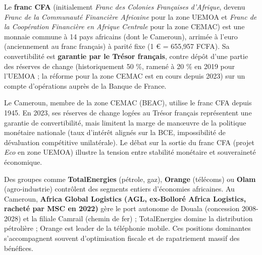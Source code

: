 \documentclass[11pt]{article}
\begin{document}
\begin{definition}
Le \textbf{franc CFA} (initialement \emph{Franc des Colonies Françaises d'Afrique}, devenu \emph{Franc de la Communauté Financière Africaine} pour la zone UEMOA et \emph{Franc de la Coopération Financière en Afrique Centrale} pour la zone CEMAC) est une monnaie commune à 14 pays africains (dont le Cameroun), arrimée à l'euro (anciennement au franc français) à parité fixe (1 € = 655,957 FCFA). Sa convertibilité est \textbf{garantie par le Trésor français}, contre dépôt d'une partie des réserves de change (historiquement 50 \%, ramené à 20 \% en 2019 pour l'UEMOA ; la réforme pour la zone CEMAC est en cours depuis 2023) sur un compte d'opérations auprès de la Banque de France.
\end{definition}

\begin{exemplebox}
Le Cameroun, membre de la zone CEMAC (BEAC), utilise le franc CFA depuis 1945. En 2023, ses réserves de change logées au Trésor français représentent une garantie de convertibilité, mais limitent la marge de manœuvre de la politique monétaire nationale (taux d'intérêt alignés sur la BCE, impossibilité de dévaluation compétitive unilatérale). Le débat sur la sortie du franc CFA (projet \emph{Eco} en zone UEMOA) illustre la tension entre stabilité monétaire et souveraineté économique.
\end{exemplebox}

\begin{propriete}
Des groupes comme \textbf{TotalEnergies} (pétrole, gaz), \textbf{Orange} (télécoms) ou \textbf{Olam} (agro-industrie) contrôlent des segments entiers d'économies africaines. Au Cameroun, \textbf{Africa Global Logistics (AGL, ex-Bolloré Africa Logistics, racheté par MSC en 2022)} gère le port autonome de Douala (concession 2008-2028) et la filiale Camrail (chemin de fer) ; TotalEnergies domine la distribution pétrolière ; Orange est leader de la téléphonie mobile. Ces positions dominantes s'accompagnent souvent d'optimisation fiscale et de rapatriement massif des bénéfices.
\end{propriete}
\end{document}
